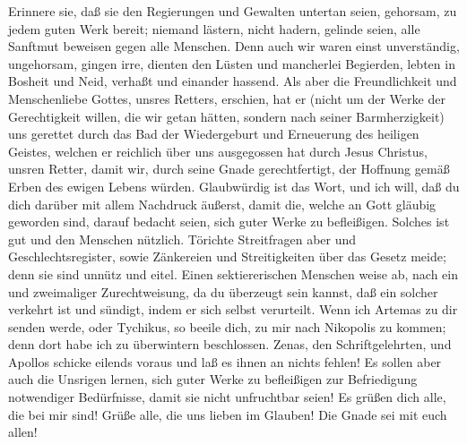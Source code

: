  Erinnere sie, daß sie den Regierungen und Gewalten
untertan seien, gehorsam, zu jedem guten Werk bereit; 
niemand lästern, nicht hadern, gelinde seien, alle Sanftmut beweisen
gegen alle Menschen.  Denn auch wir waren einst
unverständig, ungehorsam, gingen irre, dienten den Lüsten und mancherlei
Begierden, lebten in Bosheit und Neid, verhaßt und einander hassend.
 Als aber die Freundlichkeit und Menschenliebe Gottes,
unsres Retters, erschien,  hat er (nicht um der Werke der
Gerechtigkeit willen, die wir getan hätten, sondern nach seiner
Barmherzigkeit) uns gerettet durch das Bad der Wiedergeburt und
Erneuerung des heiligen Geistes,  welchen er reichlich
über uns ausgegossen hat durch Jesus Christus, unsren Retter,
 damit wir, durch seine Gnade gerechtfertigt, der Hoffnung
gemäß Erben des ewigen Lebens würden.  Glaubwürdig ist das
Wort, und ich will, daß du dich darüber mit allem Nachdruck äußerst,
damit die, welche an Gott gläubig geworden sind, darauf bedacht seien,
sich guter Werke zu befleißigen. Solches ist gut und den Menschen
nützlich.  Törichte Streitfragen aber und
Geschlechtsregister, sowie Zänkereien und Streitigkeiten über das Gesetz
meide; denn sie sind unnütz und eitel.  Einen
sektiererischen Menschen weise ab, nach ein und zweimaliger
Zurechtweisung,  da du überzeugt sein kannst, daß ein
solcher verkehrt ist und sündigt, indem er sich selbst verurteilt.
 Wenn ich Artemas zu dir senden werde, oder Tychikus, so
beeile dich, zu mir nach Nikopolis zu kommen; denn dort habe ich zu
überwintern beschlossen.  Zenas, den Schriftgelehrten,
und Apollos schicke eilends voraus und laß es ihnen an nichts fehlen!
 Es sollen aber auch die Unsrigen lernen, sich guter
Werke zu befleißigen zur Befriedigung notwendiger Bedürfnisse, damit sie
nicht unfruchtbar seien!  Es grüßen dich alle, die bei
mir sind! Grüße alle, die uns lieben im Glauben! Die Gnade sei mit euch
allen!
